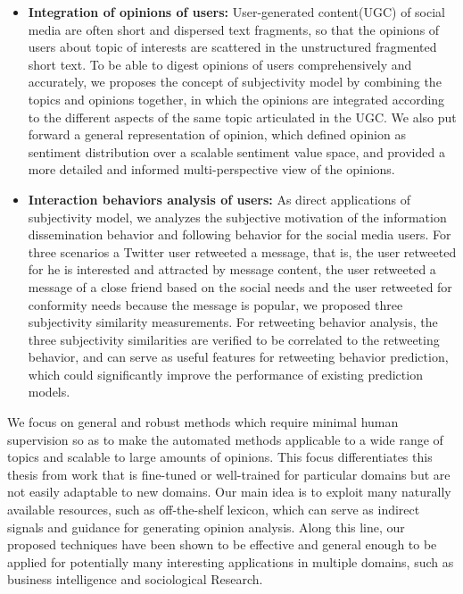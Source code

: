 \begin{eabstract}
\begin{itemize}
\item \textbf{Integration of opinions of users:} User-generated content(UGC) of social media are often short and dispersed text fragments, so that the opinions of users about topic of interests are scattered in the unstructured fragmented short text. To be able to digest opinions of users comprehensively and accurately, we proposes the concept of subjectivity model by combining the topics and opinions together, in which the opinions are integrated according to the different aspects of the same topic articulated in the UGC. We also put forward a general representation of opinion, which defined opinion as sentiment distribution over a scalable sentiment value space, and provided a more detailed and informed multi-perspective view of the opinions.
\item \textbf{Interaction behaviors analysis of users:} As direct applications of subjectivity model, we analyzes the subjective motivation of the information dissemination behavior and following behavior for the social media users. For three scenarios a Twitter user retweeted a message, that is, the user retweeted for he is interested and attracted by message content, the user retweeted a message of a close friend based on the social needs and the user retweeted for conformity needs because the message is popular, we proposed three subjectivity similarity measurements. For retweeting behavior analysis, the three subjectivity similarities are verified to be correlated to the retweeting behavior, and can serve as useful features for retweeting behavior prediction, which could significantly improve the performance of existing prediction models.
\end{itemize}

We focus on general and robust methods which require minimal human supervision so as to make the automated methods applicable to a wide range of topics and scalable to large amounts of opinions. This focus differentiates this thesis from work that is fine-tuned or well-trained for particular domains but are not easily adaptable to new domains. Our main idea is to exploit many naturally available resources, such as off-the-shelf lexicon, which can serve as indirect signals and guidance for generating opinion analysis. Along this line, our proposed techniques have been shown to be effective and general enough to be applied for potentially many interesting applications in multiple domains, such as business intelligence and sociological Research.
\end{eabstract}

